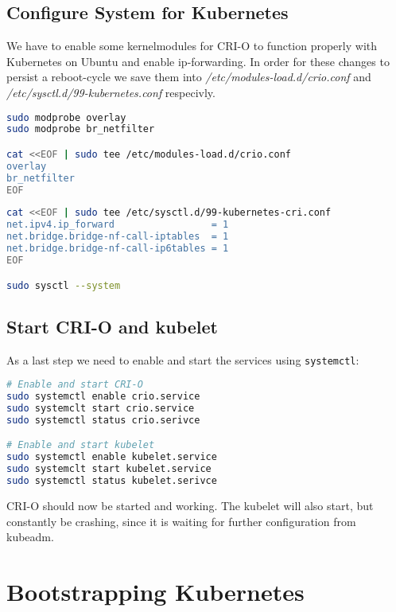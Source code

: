 \subsection{Configure System for Kubernetes}

We have to enable some kernelmodules for CRI-O to function properly with Kubernetes on Ubuntu and enable ip-forwarding. In order for these changes to persist a reboot-cycle we save them into \textit{/etc/modules-load.d/crio.conf} and \textit{/etc/sysctl.d/99-kubernetes.conf} respecivly.

\begin{lstlisting}[language=bash,caption=Enable kernelmodules] 
sudo modprobe overlay
sudo modprobe br_netfilter

cat <<EOF | sudo tee /etc/modules-load.d/crio.conf
overlay
br_netfilter
EOF
\end{lstlisting}

\begin{lstlisting}[language=bash,caption=Enable IP-Forwarding] 
cat <<EOF | sudo tee /etc/sysctl.d/99-kubernetes-cri.conf
net.ipv4.ip_forward                 = 1
net.bridge.bridge-nf-call-iptables  = 1
net.bridge.bridge-nf-call-ip6tables = 1
EOF

sudo sysctl --system
\end{lstlisting}

\subsection{Start CRI-O and kubelet}
As a last step we need to enable and start the services using \texttt{systemctl}:

\begin{lstlisting}[language=bash,caption=Starting CRI-O and kubelet services] 
# Enable and start CRI-O
sudo systemctl enable crio.service
sudo systemclt start crio.service
sudo systemctl status crio.serivce

# Enable and start kubelet
sudo systemctl enable kubelet.service
sudo systemclt start kubelet.service
sudo systemctl status kubelet.serivce
\end{lstlisting}
CRI-O should now be started and working. The kubelet will also start, but constantly be crashing, since it is waiting for further configuration from kubeadm.

\section{Bootstrapping Kubernetes}
